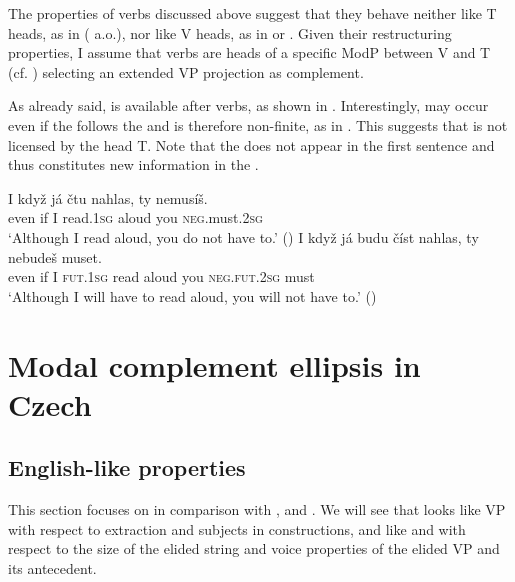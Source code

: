 \documentclass[output=paper,colorlinks,citecolor=brown,]{langsci/langscibook}
\begin{document}
\noindent The properties of   verbs discussed above suggest that they behave neither like T heads, as in  (\citealt{Sag1976} a.o.), nor like V heads, as in  or  \citep{Aelbrecht2008,Dagnac2010}. Given their restructuring properties, I assume that  verbs are heads of a specific  ModP between V and T (cf. \citealt{Cinque2004}) selecting an extended VP projection as complement.

As already said,  is available after  verbs, as shown in . Interestingly,   may occur even if the   follows the  and is therefore non-finite, as in . This suggests that  is not licensed by the head T. Note that the   does not appear in the first sentence and thus constitutes new information in the .

\begin{exe}
\ex \label{17}
\begin{xlist}
\ex \label{17a}\gll  I když  já čtu nahlas, ty    nemusíš.\\
 even if I read.\textsc{1sg} aloud   you \textsc{neg}.must.\textsc{2sg} \\
\glt `Although I read aloud, you do not have to.' \hfill ()
\ex \label{17b} \gll I když   já budu číst nahlas,  ty    nebudeš  muset.\\
even if  I   \textsc{fut}.\textsc{1sg} read aloud you \textsc{neg}.\textsc{fut}.\textsc{2sg} must\\
\glt `Although I will have to read aloud, you will not have to.' \hfill ()
\end{xlist}
\end{exe}

\section{Modal complement ellipsis in Czech} \label{sec:4}

\subsection{English-like properties}\label{sec:4.1}

\sloppy This section focuses on   in comparison with ,  and . We will see that   looks like  VP  with respect to extraction and subjects in  constructions, and like  and   with respect to the size of the elided string and voice properties of the elided VP and its antecedent.
\end{document}
